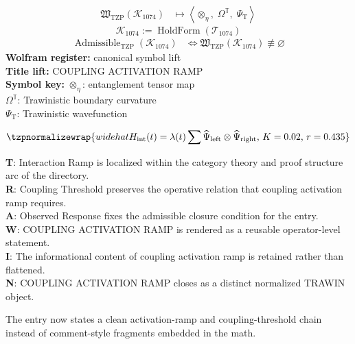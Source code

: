 \noindent
\begin{minipage}[t]{0.48\linewidth}
\begingroup
\small
\[
\begin{aligned}
\mathfrak{W}_{\mathrm{TZP}}\!\left(\mathcal{K}_{1074}\right)
&\longmapsto
\left\langle \otimes_{\eta},\; \Omega^{\mathbb{T}},\; \Psi_{\mathrm{T}} \right\rangle
\end{aligned}
\]
\[
\mathcal{K}_{1074}
:=
\operatorname{HoldForm}\!\left(\mathcal{T}_{1074}\right)
\]
\[
\begin{aligned}
\operatorname{Admissible}_{\mathrm{TZP}}\!\left(\mathcal{K}_{1074}\right)
&\Longleftrightarrow
\mathfrak{W}_{\mathrm{TZP}}\!\left(\mathcal{K}_{1074}\right)\not\equiv\varnothing
\end{aligned}
\]
\textbf{Wolfram register:} canonical symbol lift\\
\textbf{Title lift:} COUPLING ACTIVATION RAMP\\
\textbf{Symbol key:} \(\otimes_{\eta}\): entanglement tensor map\\ \(\Omega^{\mathbb{T}}\): Trawinistic boundary curvature\\ \(\Psi_{\mathrm{T}}\): Trawinistic wavefunction
\par
\endgroup
\end{minipage}\hfill
\begin{minipage}[t]{0.48\linewidth}
\[
\tzpnormalizewrap{widehat{H}_{\mathrm{int}}(t)=\lambda(t)\sum \widehat{\Psi}_{\mathrm{left}}\otimes \widehat{\Psi}_{\mathrm{right}},\,K=0.02,\,r=0.435}
\]

\small
\textbf{T}: Interaction Ramp is localized within the category theory and proof structure arc of the directory.\\
\textbf{R}: Coupling Threshold preserves the operative relation that coupling activation ramp requires.\\
\textbf{A}: Observed Response fixes the admissible closure condition for the entry.\\
\textbf{W}: COUPLING ACTIVATION RAMP is rendered as a reusable operator-level statement.\\
\textbf{I}: The informational content of coupling activation ramp is retained rather than flattened.\\
\textbf{N}: COUPLING ACTIVATION RAMP closes as a distinct normalized TRAWIN object.
\normalsize
\end{minipage}

The entry now states a clean activation-ramp and coupling-threshold chain instead of comment-style fragments embedded in the math.
\clearpage

